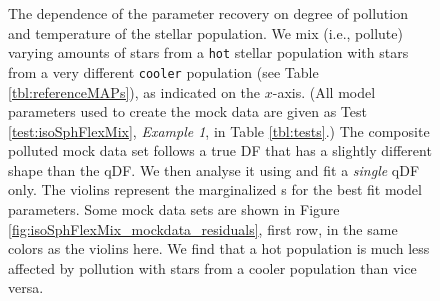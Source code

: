 \begin{figure}[!htbp]
\caption{The dependence of the parameter recovery on degree of pollution and temperature of the stellar population. We mix (i.e., pollute) varying amounts of stars from a \texttt{hot} stellar population with stars from a very different \texttt{cooler} population (see Table \ref{tbl:referenceMAPs}), as indicated on the $x$-axis. (All model parameters used to create the mock data are given as Test \ref{test:isoSphFlexMix}, \emph{Example 1}, in Table \ref{tbl:tests}.) The composite polluted mock data set follows a true DF that has a slightly different shape than the qDF. We then analyse it using \RM{} and fit a \emph{single} qDF only. The violins represent the marginalized \pdf{}s for the best fit model parameters.  Some mock data sets are shown in Figure \ref{fig:isoSphFlexMix_mockdata_residuals}, first row, in the same colors as the violins here.  We find that a hot population is much less affected by pollution with stars from a cooler population than vice versa.  }
\label{fig:isoSphFlexMixCont}
\end{figure}




